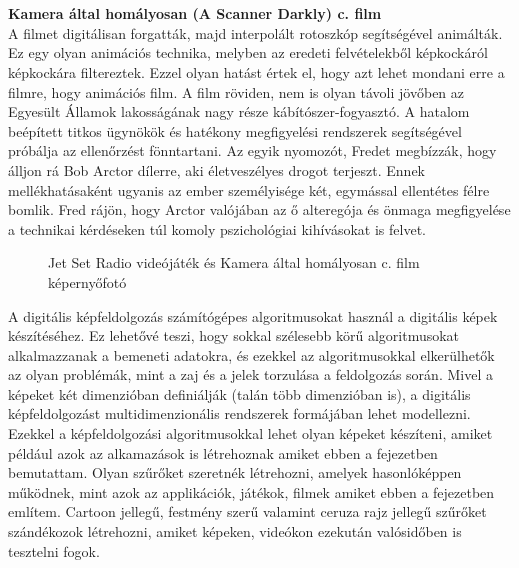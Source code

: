 \\
\\
\textbf{Kamera által homályosan (A Scanner Darkly) c. film} 
\\
A filmet digitálisan forgatták, majd interpolált rotoszkóp segítségével animálták. Ez egy olyan animációs technika, melyben az eredeti felvételekből képkockáról képkockára filtereztek. Ezzel olyan hatást értek el, hogy azt lehet mondani erre a filmre, hogy animációs film. A film röviden, nem is olyan távoli jövőben az Egyesült Államok lakosságának nagy része kábítószer-fogyasztó. A hatalom beépített titkos ügynökök és hatékony megfigyelési rendszerek segítségével próbálja az ellenőrzést fönntartani. Az egyik nyomozót, Fredet megbízzák, hogy álljon rá Bob Arctor dílerre, aki életveszélyes drogot terjeszt. Ennek mellékhatásaként ugyanis az ember személyisége két, egymással ellentétes félre bomlik. Fred rájön, hogy Arctor valójában az ő alteregója és önmaga megfigyelése a technikai kérdéseken túl komoly pszichológiai kihívásokat is felvet. %
\begin{figure}[ht]
\centering
{}
\caption{Jet Set Radio videójáték és Kamera által homályosan c. film képernyőfotó} 
\label{fig: Jatek, film}
\end{figure}
A digitális képfeldolgozás számítógépes algoritmusokat használ a digitális képek készítéséhez. Ez lehetővé teszi, hogy sokkal szélesebb körű algoritmusokat alkalmazzanak a bemeneti adatokra, és ezekkel az algoritmusokkal elkerülhetők az olyan problémák, mint a zaj és a jelek torzulása a feldolgozás során. Mivel a képeket két dimenzióban definiálják (talán több dimenzióban is), a digitális képfeldolgozást multidimenzionális rendszerek formájában lehet modellezni.  Ezekkel a képfeldolgozási algoritmusokkal lehet olyan képeket készíteni, amiket például azok az alkamazások is létrehoznak amiket ebben a fejezetben bemutattam.
Olyan szűrőket szeretnék létrehozni, amelyek hasonlóképpen működnek, mint azok az applikációk, játékok, filmek amiket ebben a fejezetben említem. Cartoon jellegű, festmény szerű valamint ceruza rajz jellegű szűrőket szándékozok létrehozni, amiket  képeken, videókon ezekután valósidőben is tesztelni fogok. 


